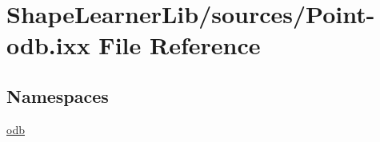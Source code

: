 \hypertarget{_point-odb_8ixx}{}\section{Shape\+Learner\+Lib/sources/\+Point-\/odb.ixx File Reference}
\label{_point-odb_8ixx}
\subsection*{Namespaces}
\begin{DoxyCompactItemize}
\item 
 \hyperlink{namespaceodb}{odb}
\end{DoxyCompactItemize}
